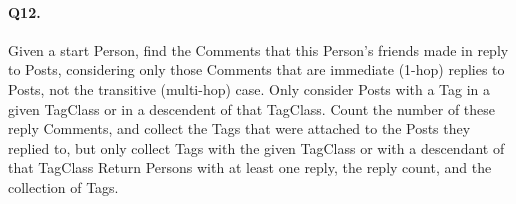 \paragraph{Q12.}
Given a start Person, find the Comments that this Person's friends made
in reply to Posts, considering only those Comments that are immediate
(1-hop) replies to Posts, not the transitive (multi-hop) case. Only
consider Posts with a Tag in a given TagClass or in a descendent of that
TagClass. Count the number of these reply Comments, and collect the Tags
that were attached to the Posts they replied to, but only collect Tags
with the given TagClass or with a descendant of that TagClass Return
Persons with at least one reply, the reply count, and the collection of
Tags.
